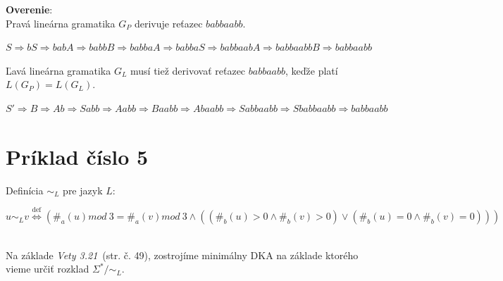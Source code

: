 \documentclass[11pt,a4paper]{article}
\begin{document}
\textbf{Overenie}:\\
Pravá lineárna gramatika $G_P$ derivuje reťazec $babbaabb$.
\begin{center}
$S \Rightarrow bS \Rightarrow babA  \Rightarrow babbB \Rightarrow babbaA \Rightarrow babbaS \Rightarrow babbaabA \Rightarrow babbaabbB \Rightarrow babbaabb$
\end{center}

Ľavá lineárna gramatika $G_L$ musí tiež derivovať reťazec $babbaabb$, keďže platí $L(G_P)=L(G_L)$.
\begin{center}
$S' \Rightarrow B \Rightarrow Ab \Rightarrow Sabb \Rightarrow Aabb \Rightarrow Baabb \Rightarrow Abaabb \Rightarrow Sabbaabb \Rightarrow Sbabbaabb \Rightarrow babbaabb$
\end{center}



\newpage
\section{Príklad číslo 5}

Definícia $\sim_L$ pre jazyk $L$:\\[-1.5em]
\begin{center}
$u \sim_L v \stackrel{\text{def}}{\Longleftrightarrow} (\#_a(u)mod\ 3 = \#_a(v)mod\ 3 \wedge ((\#_b(u) > 0 \wedge \#_b(v) > 0) \vee (\#_b(u) = 0 \wedge \#_b(v) = 0)))$
\end{center}

\hfill\\

Na základe \textit{Vety 3.21}~\cite{TIN}(str. č. 49), zostrojíme minimálny DKA na základe ktorého vieme určiť rozklad $\Sigma^* / \sim_L$.
\end{document}
